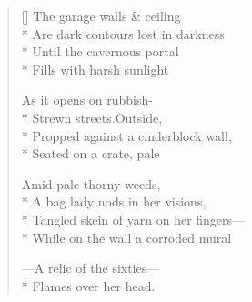 \label{ch:bus_depot}
\settowidth{\versewidth}{Tangled skein of yarn on her fingers—}
\begin{verse}[\versewidth]
The garage walls \& ceiling\\*
Are dark contours lost in darkness\\*
Until the cavernous portal\\*
Fills with harsh sunlight

As it opens on rubbish-\\*
Strewn streets.\qquad Outside,\\*
Propped against a cinderblock wall,\\*
Seated on a crate, pale

Amid pale thorny weeds,\\*
A bag lady nods in her visions,\\*
Tangled skein of yarn on her fingers---\\*
While on the wall a corroded mural

---A relic of the sixties---\\*
Flames over her head.
\end{verse}
